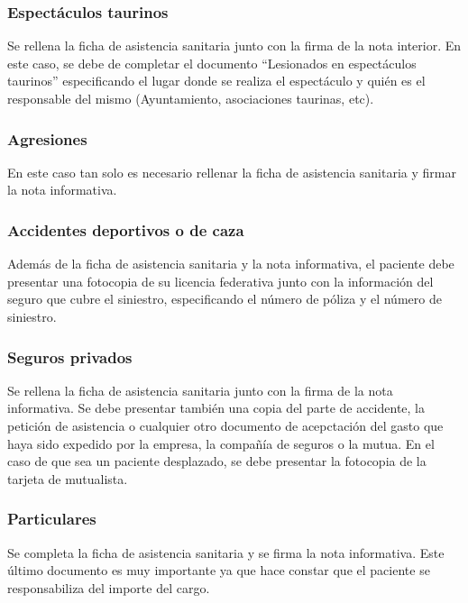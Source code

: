 \subsubsection{Espectáculos taurinos}

Se rellena la ficha de asistencia sanitaria junto con la firma de la nota interior.
En este caso, se debe de completar el documento ``Lesionados en espectáculos taurinos'' especificando el lugar donde se realiza el espectáculo y quién es el responsable del mismo (Ayuntamiento, asociaciones taurinas, etc).

\subsubsection{Agresiones}

En este caso tan solo es necesario rellenar la ficha de asistencia sanitaria y firmar la nota informativa.

\subsubsection{Accidentes deportivos o de caza}

Además de la ficha de asistencia sanitaria y la nota informativa, el paciente debe presentar una fotocopia de su licencia federativa junto con la información del seguro que cubre el siniestro, especificando el número de póliza y el número de siniestro.

\subsubsection{Seguros privados}

Se rellena la ficha de asistencia sanitaria junto con la firma de la nota informativa.
Se debe presentar también una copia del parte de accidente, la petición de asistencia o cualquier otro documento de acepctación del gasto que haya sido expedido por la empresa, la compañía de seguros o la mutua.
En el caso de que sea un paciente desplazado, se debe presentar la fotocopia de la tarjeta de mutualista.

\subsubsection{Particulares}

Se completa la ficha de asistencia sanitaria y se firma la nota informativa. Este último documento es muy importante ya que hace constar que el paciente se responsabiliza del importe del cargo.

